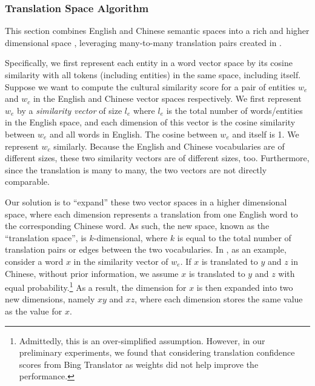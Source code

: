 
\subsubsection{Translation Space Algorithm}

This section combines English and Chinese semantic spaces into
a rich and higher dimensional space , leveraging many-to-many translation pairs
created in .

Specifically, %
we first represent each entity in a word vector space
by its cosine similarity with all tokens (including entities) in the
same space, including itself.
Suppose we want to compute the cultural similarity score for a pair of
entities $w_e$ and $w_c$ in the English and Chinese vector spaces respectively.
We first represent $w_e$ by a
{\em similarity vector} of size $l_e$ where $l_e$ is the total number of
words/entities in the English space, and each dimension of this
vector is the cosine similarity between $w_e$ and all words in English.
The cosine between $w_e$ and itself is 1.
We represent $w_c$ similarly. Because the English and Chinese vocabularies
are of different sizes, these two similarity vectors are of different sizes,
too. Furthermore, since the translation is many to many,
the two vectors are not directly comparable.

Our solution is to ``expand'' these two vector spaces in a higher dimensional space,
where each dimension represents a translation from one English word
to the corresponding Chinese word. As such, the new space, known as the
``translation space'', is $k$-dimensional, where $k$ is equal to the total
number of translation pairs or edges between the two vocabularies.
In , as an example,
consider a word $x$ in the similarity
vector of $w_e$. If $x$ is translated to $y$ and $z$ in Chinese,
without prior information, we assume $x$ is translated to $y$ and $z$ with
equal probability.\footnote{Admittedly, this is an over-simplified assumption. However, in our preliminary experiments, we found that considering translation confidence scores from Bing Translator as weights did not help improve the performance.} As a result, the dimension for $x$ is then
expanded into two new dimensions,
namely $xy$ and $xz$, where each dimension stores the same value
as the value for $x$.

